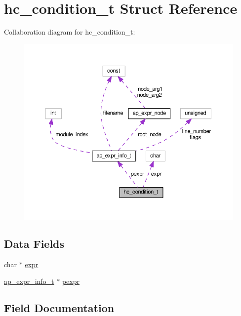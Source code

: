 \hypertarget{structhc__condition__t}{}\section{hc\+\_\+condition\+\_\+t Struct Reference}
\label{structhc__condition__t}


Collaboration diagram for hc\+\_\+condition\+\_\+t\+:
\nopagebreak
\begin{figure}[H]
\begin{center}
\leavevmode
\includegraphics[width=350pt]{structhc__condition__t__coll__graph}
\end{center}
\end{figure}
\subsection*{Data Fields}
\begin{DoxyCompactItemize}
\item 
char $\ast$ \hyperlink{structhc__condition__t_a865911c21fd3c03f128c589f97f1894f}{expr}
\item 
\hyperlink{structap__expr__info__t}{ap\+\_\+expr\+\_\+info\+\_\+t} $\ast$ \hyperlink{structhc__condition__t_a56a401abc8e84152d842cb8a37d37e7d}{pexpr}
\end{DoxyCompactItemize}


\subsection{Field Documentation}
